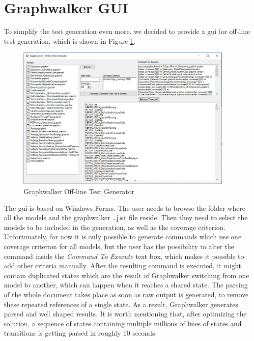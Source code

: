 \section{Graphwalker GUI}
\par
To simplify the test generation even more, we decided to provide a \acrshort{gui} for off-line test generation, which is shown in Figure \ref{Fig:Graphwalker_GUi}.

\begin{figure} [htbp!]
	\centering
					\includegraphics[width=0.95\textwidth]{figures/Graphwalker_GUI_screenshot}
					\caption{\label{Fig:Graphwalker_GUi} Graphwalker Off-line Test Generator}
\end{figure}

\par
The \acrshort{gui} is based on Windows Forms. The user needs to browse the folder where all the models and the graphwalker \texttt{.jar} file reside. Then they need to select the models to be included in the generation, as well as the coverage criterion. Unfortunately, for now it is only possible to generate commands which use one coverage criterion for all models, but the user has the possibility to alter the command inside the \textit{Command To Execute} text box, which makes it possible to add other criteria manually. After the resulting command is executed, it might contain duplicated states which are the result of Graphwalker switching from one model to another, which can happen when it reaches a shared state. The parsing of the whole document takes place as soon as raw output is generated, to remove these repeated references of a single state. As a result, Graphwalker generates parsed and well shaped results. It is worth mentioning that, after optimizing the solution, a sequence of states containing multiple millions of lines of states and transitions is getting parsed in roughly 10 seconds.

